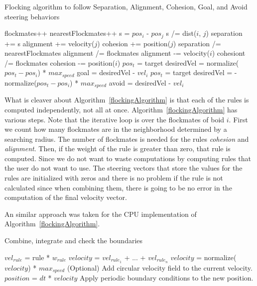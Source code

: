 \begin{algorithm}
\caption{Flocking algorithm to follow Separation, Alignment, Cohesion, Goal, and Avoid steering behaviors}
\label{flockingAlgorithm}
\begin{algorithmic}
	\STATE flockmates++
				\STATE nearestFlockmates++
				\STATE s = $pos_i$ - $pos_j$ 
				\STATE s /= dist($i$, $j$) 
				\STATE separation += s
			\ENDIF
		\ENDIF
			\STATE alignment += velocity($j$)
		\ENDIF
			\STATE cohesion += position($j$)
		\ENDIF
	\ENDIF
\ENDFOR
{}
	\STATE separation /= nearestFlockmates
\ENDIF
{}
	\STATE alignment /=  flockmates
	\STATE alignment -= velocity($i$)
\ENDIF
{}
	\STATE cohesiont /=  flockmates
	\STATE cohesion -= position($i$)
\ENDIF
{}
	\STATE $pos_t$ = target
	\STATE desiredVel = normalize($pos_t - pos_i$) * $max_{speed}$
	\STATE goal = desiredVel - $vel_i$
\ENDIF
{}
	\STATE $pos_t$ = target
	\STATE desiredVel = -normalize($pos_t - pos_i$) * $max_{speed}$
	\STATE avoid = desiredVel - $vel_i$
\ENDIF

\end{algorithmic}
\end{algorithm}

What is cleaver about Algorithm~\ref{flockingAlgorithm} is that each of the rules is computed independently, not all at once. Algorithm~\ref{flockingAlgorithm} has various steps. Note that the iterative loop is over the flockmates of boid $i$. First we count how many flockmates are in the neighborhood determined by a searching radius. The number of flockmates is needed for the rules \textit{cohesion} and \textit{alignment}. Then, if the weight of the rule is greater than zero, that rule is computed. Since we do not want to waste computations by computing rules that the user do not want to use. The steering vectors that store the values for the rules are initialized with zeros and there is no problem if the rule is not calculated since when combining them, there is going to be no error in the computation of the final velocity vector.

An similar approach was taken for the CPU implementation of Algorithm~\ref{flockingAlgorithm}.

\begin{algorithm}
\caption{Combine, integrate and check the boundaries}
\label{combineAlgorithm}
\begin{algorithmic}
\STATE $vel_{rule}$  = rule * $w_{rule}$
\STATE $velocity$ = $vel_{rule_1}$ + ... + $vel_{rule_n}$
	\STATE $velocity$ = normalize($velocity$) * $max_{speed}$
\ENDIF  
\STATE (Optional) Add circular velocity field to the current velocity.
\STATE $position$ = $dt$ * $velocity$
\STATE Apply periodic boundary conditions to the new position.
\end{algorithmic}
\end{algorithm}

